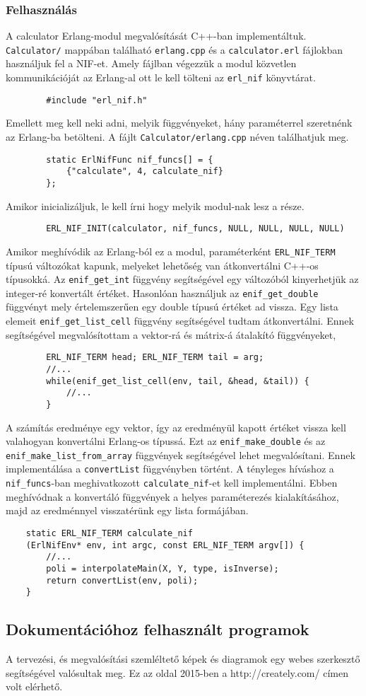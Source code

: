 	\subsubsection{Felhasználás}
	A calculator Erlang-modul megvalósítását C++-ban implementáltuk.\newline
	\texttt{Calculator/} mappában található \texttt{erlang.cpp} és a \texttt{calculator.erl} fájlokban használjuk fel a NIF-et.
	Amely fájlban végezzük a modul közvetlen kommunikációját az Erlang-al ott le kell tölteni az \texttt{erl\_nif} könyvtárat.
	\begin{verbatim}
		#include "erl_nif.h"
	\end{verbatim}
	Emellett meg kell neki adni, melyik függvényeket, hány paraméterrel szeretnénk az Erlang-ba betölteni. 
	A fájlt \texttt{Calculator/erlang.cpp} néven találhatjuk meg.
	\begin{verbatim}
		static ErlNifFunc nif_funcs[] = {
		    {"calculate", 4, calculate_nif}
		};
	\end{verbatim}
	Amikor inicializáljuk, le kell írni hogy melyik modul-nak lesz a része. 
	\begin{verbatim}
		ERL_NIF_INIT(calculator, nif_funcs, NULL, NULL, NULL, NULL)
	\end{verbatim}
	Amikor meghívódik az Erlang-ból ez a modul, paraméterként \texttt{ERL\_NIF\_TERM} típusú változókat kapunk, melyeket lehetőség van átkonvertálni C++-os típusokká. \newline
	Az \texttt{enif\_get\_int} függvény segítségével egy változóból kinyerhetjük az integer-ré konvertált értéket. Hasonlóan használjuk az \texttt{enif\_get\_double} függvényt mely értelemszerűen egy double típusú értéket ad vissza.
	\newline
	Egy lista elemeit \texttt{enif\_get\_list\_cell} függvény segítségével tudtam átkonvertálni. 
	Ennek segítségével megvalósítottam a vektor-rá és mátrix-á átalakító függvényeket,
	\begin{verbatim}
		ERL_NIF_TERM head; ERL_NIF_TERM tail = arg;
		//...
		while(enif_get_list_cell(env, tail, &head, &tail)) {
		    //...
		}
	\end{verbatim}
	A számítás eredménye egy vektor, így az eredményül kapott értéket vissza kell valahogyan konvertálni Erlang-os típussá. Ezt az \texttt{enif\_make\_double} és az \\ \texttt{enif\_make\_list\_from\_array} függvények segítségével lehet megvalósítani. 
	Ennek implementálása a \texttt{convertList} függvényben történt.
	\newline
	A tényleges híváshoz a \texttt{nif\_funcs}-ban meghivatkozott \texttt{calculate\_nif}-et kell implementálni. \newline
	Ebben meghívódnak a konvertáló függvények a helyes paraméterezés kialakításához, majd az eredménnyel visszatérünk egy lista formájában.
	\begin{verbatim}
	static ERL_NIF_TERM calculate_nif
	(ErlNifEnv* env, int argc, const ERL_NIF_TERM argv[]) {
	    //...
	    poli = interpolateMain(X, Y, type, isInverse);
	    return convertList(env, poli);
	}
	\end{verbatim}

\subsection{Dokumentációhoz felhasznált programok}
	A tervezési, és megvalósítási szemléltető képek és diagramok egy webes szerkesztő segítségével valósultak meg. Ez az oldal 2015-ben a http://creately.com/ címen volt elérhető.